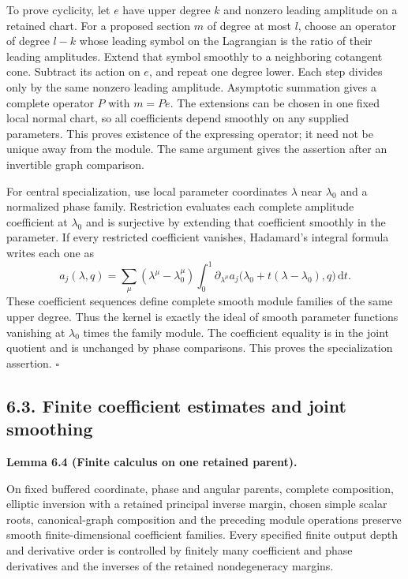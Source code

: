 \documentclass[
  english,
  11pt,
  reqno]{amsart}
\makeatletter
\newcommand{\paperdisplaynext}{%
  \let\paper@savedstartsection\@startsection
  \def\@startsection##1##2##3##4##5##6{%
    \let\@startsection\paper@savedstartsection
    \@tempskipa ##5\relax
    \ifdim\@tempskipa<\z@
      \def\paper@afterskip{.35\baselineskip}%
    \else
      \def\paper@afterskip{##5}%
    \fi
    \@startsection{##1}{##2}{##3}{##4}{\paper@afterskip}{##6}}}
\newcommand{\paperdisplaysection}{\paperdisplaynext\subsection}
\newcommand{\pandocstatementheading}[1]{%
  \par\if@nobreak\else
    \addpenalty{\@beginparpenalty}%
    \addvspace{.5\baselineskip plus .2\baselineskip minus .2\baselineskip}%
  \fi
  {\normalfont\bfseries #1\par}%
  \nobreak\@afterindenttrue\@afterheading
}
\let\paper@displaysection\paperdisplaysection
\renewcommand{\paperdisplaysection}[1]{%
  \let\paper@savedhangfrom\@hangfrom
  \long\def\@hangfrom##1##2{%
    \paper@savedhangfrom{##1}{\paper@headingparagraph##2}}%
  \paper@displaysection{#1}%
  \let\@hangfrom\paper@savedhangfrom}
\makeatother
\begin{document}
To prove cyclicity, let \(e\) have upper degree \(k\) and nonzero
leading amplitude on a retained chart. For a proposed section \(m\) of
degree at most \(l\), choose an operator of degree \(l-k\) whose leading
symbol on the Lagrangian is the ratio of their leading amplitudes.
Extend that symbol smoothly to a neighboring cotangent cone. Subtract
its action on \(e\), and repeat one degree lower. Each step divides only
by the same nonzero leading amplitude. Asymptotic summation gives a
complete operator \(P\) with \(m=Pe\). The extensions can be chosen in
one fixed local normal chart, so all coefficients depend smoothly on any
supplied parameters. This proves existence of the expressing operator;
it need not be unique away from the module. The same argument gives the
assertion after an invertible graph comparison.

For central specialization, use local parameter coordinates \(\lambda\)
near \(\lambda_0\) and a normalized phase family. Restriction evaluates
each complete amplitude coefficient at \(\lambda_0\) and is surjective
by extending that coefficient smoothly in the parameter. If every
restricted coefficient vanishes, Hadamard's integral formula writes each
one as%
 \[
a_j(\lambda,q)=\sum_\mu(\lambda^\mu-\lambda_0^\mu)
\int_0^1\partial_{\lambda^\mu}a_j
\bigl(\lambda_0+t(\lambda-\lambda_0),q\bigr)\,\mathrm dt.
\] These coefficient sequences define complete smooth module families of
the same upper degree. Thus the kernel is exactly the ideal of smooth
parameter functions vanishing at \(\lambda_0\) times the family module.
The coefficient equality is in the joint quotient and is unchanged by
phase comparisons. This proves the specialization assertion.
\hfill\(\square\)

\paperdisplaysection{6.3. Finite coefficient estimates and joint
smoothing}\label{finite-coefficient-estimates-and-joint-smoothing}\label{sec:online-finite-calculus-estimates}

\pandocstatementheading{\leavevmode{}\label{lem:online-finite-symbol-family-calculus}Lemma 6.4 (Finite calculus on one retained parent).}

On fixed buffered coordinate, phase and angular parents, complete
composition, elliptic inversion with a retained principal inverse
margin, chosen simple scalar roots, canonical-graph composition and the
preceding module operations preserve smooth finite-dimensional
coefficient families. Every specified finite output depth and derivative
order is controlled by finitely many coefficient and phase derivatives
and the inverses of the retained nondegeneracy margins.
\end{document}
